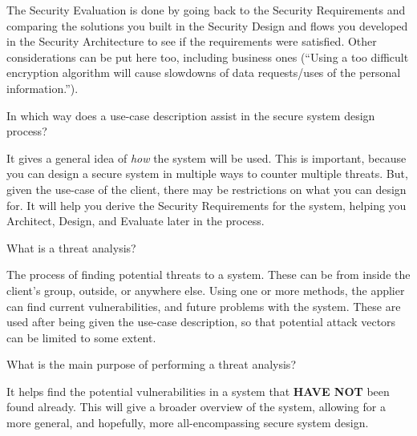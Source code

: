 \begin{questions}
\begin{parts}
\begin{solution}
      The Security Evaluation is done by going back to the Security Requirements and comparing the solutions you built in the Security Design and flows you developed in the Security Architecture to see if the requirements were satisfied.
      Other considerations can be put here too, including business ones (``Using a too difficult encryption algorithm will cause slowdowns of data requests/uses of the personal information.'').
    \end{solution}
  \end{parts}

\question{} In which way does a use-case description assist in the secure system design process?
  \begin{solution}
    It gives a general idea of \emph{how} the system will be used.
    This is important, because you can design a secure system in multiple ways to counter multiple threats.
    But, given the use-case of the client, there may be restrictions on what you can design for.
    It will help you derive the Security Requirements for the system, helping you Architect, Design, and Evaluate later in the process.
  \end{solution}

\question{} What is a threat analysis?
  \begin{solution}
    The process of finding potential threats to a system.
    These can be from inside the client's group, outside, or anywhere else.
    Using one or more methods, the applier can find current vulnerabilities, and future problems with the system.
    These are used after being given the use-case description, so that potential attack vectors can be limited to some extent.
  \end{solution}

\question{} What is the main purpose of performing a threat analysis?
  \begin{solution}
    It helps find the potential vulnerabilities in a system that \textbf{HAVE NOT} been found already.
    This will give a broader overview of the system, allowing for a more general, and hopefully, more all-encompassing secure system design.
  \end{solution}


\end{questions}
